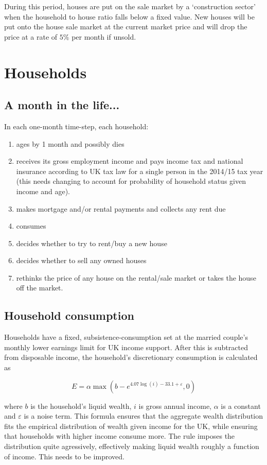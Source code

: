 \documentclass{article}
\begin{document}
During this period, houses are put on the sale market by a `construction sector' when the household to house ratio falls below a fixed value. New houses will be put onto the house sale market at the current market price and will drop the price at a rate of $5\%$ per month if unsold.

\section{Households}

\subsection{A month in the life...}
In each one-month time-step, each household:
\begin{enumerate}
\item ages by 1 month and possibly dies
\item receives its gross employment income and pays income tax and national insurance according to UK tax law for a single person in the 2014/15 tax year (this needs changing to account for probability of household status given income and age).
\item makes mortgage and/or rental payments and collects any rent due
\item consumes
\item decides whether to try to rent/buy a new house
\item decides whether to sell any owned houses
\item rethinks the price of any house on the rental/sale market or takes the house off the market.
\end{enumerate}

\subsection{Household consumption}

Households have a fixed, subsistence-consumption set at the married couple's monthly lower earnings limit for UK income support. After this is subtracted from disposable income, the household's discretionary consumption is calculated as

\begin{equation}
E=\alpha \max \left( b-e^{4.07\log (i)-33.1+\varepsilon },0\right)
\end{equation}

where $b$ is the household's liquid wealth, $i$ is gross annual income, $\alpha$ is a constant and $\varepsilon$ is a noise term. This formula ensures that the aggregate wealth distribution fits the empirical distribution of wealth given income for the UK, while ensuring that households with higher income consume more. The rule imposes the distribution quite agressively, effectively making liquid wealth roughly a function of income. This needs to be improved.
\end{document}
